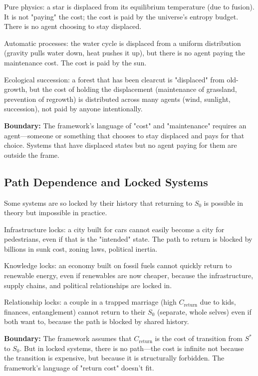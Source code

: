 \documentclass[12pt]{article}
\begin{document}
Pure physics: a star is displaced from its equilibrium temperature (due to fusion). It is not "paying" the cost; the cost is paid by the universe's entropy budget. There is no agent choosing to stay displaced.

Automatic processes: the water cycle is displaced from a uniform distribution (gravity pulls water down, heat pushes it up), but there is no agent paying the maintenance cost. The cost is paid by the sun.

Ecological succession: a forest that has been clearcut is "displaced" from old-growth, but the cost of holding the displacement (maintenance of grassland, prevention of regrowth) is distributed across many agents (wind, sunlight, succession), not paid by anyone intentionally.

\textbf{Boundary:} The framework's language of "cost" and "maintenance" requires an agent—someone or something that chooses to stay displaced and pays for that choice. Systems that have displaced states but no agent paying for them are outside the frame.

\subsection{Path Dependence and Locked Systems}

Some systems are so locked by their history that returning to $S_0$ is possible in theory but impossible in practice.

Infrastructure locks: a city built for cars cannot easily become a city for pedestrians, even if that is the "intended" state. The path to return is blocked by billions in sunk cost, zoning laws, political inertia.

Knowledge locks: an economy built on fossil fuels cannot quickly return to renewable energy, even if renewables are now cheaper, because the infrastructure, supply chains, and political relationships are locked in.

Relationship locks: a couple in a trapped marriage (high $C_{\text{return}}$ due to kids, finances, entanglement) cannot return to their $S_0$ (separate, whole selves) even if both want to, because the path is blocked by shared history.

\textbf{Boundary:} The framework assumes that $C_{\text{return}}$ is the cost of transition from $S^*$ to $S_0$. But in locked systems, there is no path—the cost is infinite not because the transition is expensive, but because it is structurally forbidden. The framework's language of "return cost" doesn't fit.
\end{document}
